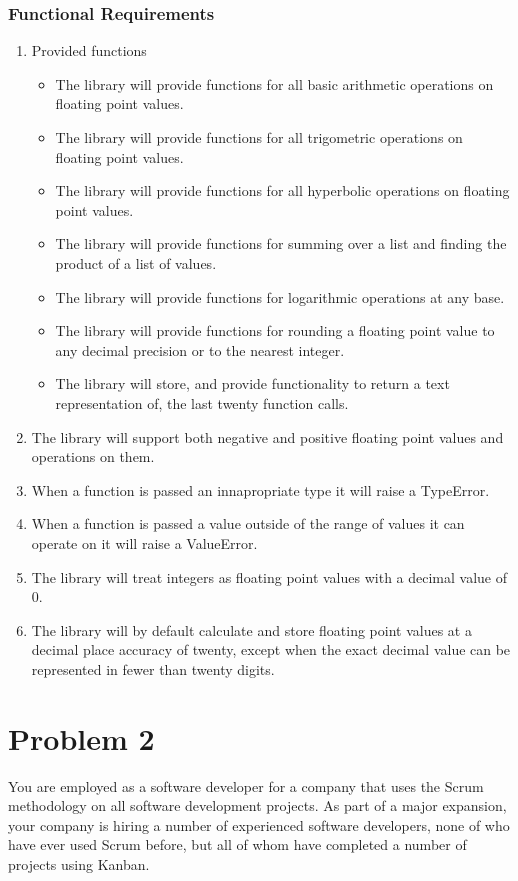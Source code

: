 \documentclass{article}
\begin{document}
    \subsubsection{Functional Requirements}
      \begin{enumerate}
        \item Provided functions
        \begin{itemize}
          \item The library will provide functions for all basic arithmetic operations on floating point values.
          \item The library will provide functions for all trigometric operations on floating point values.
          \item The library will provide functions for all hyperbolic operations on floating point values.
          \item The library will provide functions for summing over a list and finding the product of a list of values.
          \item The library will provide functions for logarithmic operations at any base.
          \item The library will provide functions for rounding a floating point value to any decimal precision or to the nearest integer.
          \item The library will store, and provide functionality to return a text representation of, the last twenty function calls.
        \end{itemize}
        \item The library will support both negative and positive floating point values and operations on them.
        \item When a function is passed an innapropriate type it will raise a TypeError.
        \item When a function is passed a value outside of the range of values it can operate on it will raise a ValueError.
        \item The library will treat integers as floating point values with a decimal value of 0.
        \item The library will by default calculate and store floating point values at a
              decimal place accuracy of twenty, except when the exact decimal value can be represented
              in fewer than twenty digits.
      \end{enumerate}

\section{Problem 2}
  You are employed as a software developer for a company that uses the Scrum methodology
  on all software development projects. As part of a major expansion, your company
  is hiring a number of experienced software developers, none of who have ever used
  Scrum before, but all of whom have completed a number of projects using Kanban.
\end{document}
